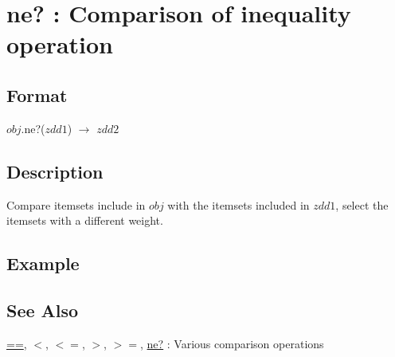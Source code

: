
\section{ne? : Comparison of inequality operation\label{sect:ne}}
\subsection*{Format}
$obj$.ne?($zdd1$) $\rightarrow$ $zdd2$

\subsection*{Description}
Compare itemsets include in $obj$ with the itemsets included in $zdd1$, select the itemsets with a different weight.

\subsection*{Example}


\subsection*{See Also}
\hyperref[sect:eq]{==},
\hyperref[sect:lt]{$<$},
\hyperref[sect:le]{$<=$},
\hyperref[sect:gt]{$>$},
\hyperref[sect:ge]{$>=$},
\hyperref[sect:ne]{ne?} : Various comparison operations
